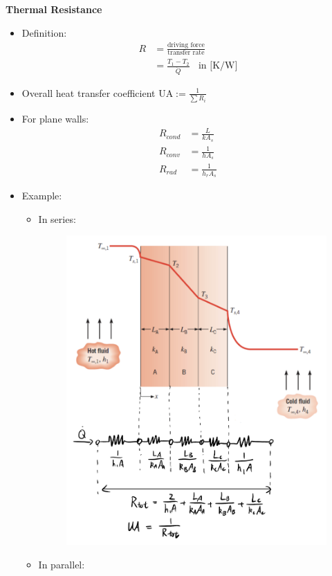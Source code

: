 \large\textbf{Thermal Resistance}
\begin{itemize}
    \item Definition:
    \begin{align*}
        R &= \frac{\text{driving force}}{\text{transfer rate}} \\
        &= \frac{T_1 - T_2}{\dot{Q}}\;\; \text{ in [K/W]}
    \end{align*}
    \item Overall heat transfer coefficient UA$:=\frac{1}{\sum R_i}$
    \item For \color{red} plane walls: \color{black}
    \begin{align*}
        R_{cond} &= \frac{L}{kA_s} \\
        R_{conv} &= \frac{1}{h A_s} \\
        R_{rad} &= \frac{1}{h_r A_s}
    \end{align*}
    \item Example:
    \begin{itemize}
        \item In series:
        \begin{figure}[H]
            \centering
            \includegraphics[width=0.85\linewidth]{images/thermal_resistance.png}
        \end{figure}
        \item In parallel:

\end{itemize}
\end{itemize}
